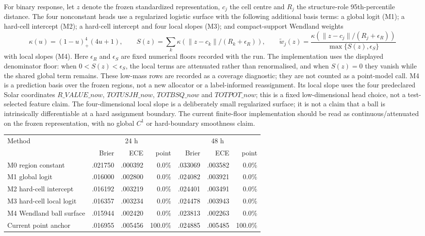 \documentclass[11pt,a4paper]{article}
\numberwithin{equation}{section}
\theoremstyle{definition}\newtheorem{definition}[theorem]{Definition}
\theoremstyle{remark}\newtheorem{remark}[theorem]{Remark}
\begin{document}
For binary response, let $z$ denote the frozen standardized representation, $c_j$ the cell centre and $R_j$ the structure-role 95th-percentile distance. The four nonconstant heads use a regularized logistic surface with the following additional basis terms: a global logit (M1); a hard-cell intercept (M2); a hard-cell intercept and four local slopes (M3); and compact-support Wendland weights
\[
\kappa(u)=(1-u)_+^4(4u+1),\qquad
S(z)=\sum_k\kappa(\|z-c_k\|/(R_k+\epsilon_R)),\qquad
\widetilde w_j(z)=\frac{\kappa(\|z-c_j\|/(R_j+\epsilon_R))}{\max\{S(z),\epsilon_S\}}
\]
with local slopes (M4). Here $\epsilon_R$ and $\epsilon_S$ are fixed numerical floors recorded with the run. The implementation uses the displayed denominator floor: when $0<S(z)<\epsilon_S$, the local terms are attenuated rather than renormalised, and when $S(z)=0$ they vanish while the shared global term remains. These low-mass rows are recorded as a coverage diagnostic; they are not counted as a point-model call. M4 is a prediction basis over the frozen regions, not a new allocator or a label-informed reassignment. Its local slope uses the four predeclared Solar coordinates $R\_VALUE\_now$, $TOTUSJH\_now$, $TOTBSQ\_now$ and $TOTPOT\_now$; this is a fixed low-dimensional head choice, not a test-selected feature claim. The four-dimensional local slope is a deliberately small regularized surface; it is not a claim that a ball is intrinsically differentiable at a hard assignment boundary. The current finite-floor implementation should be read as continuous/attenuated on the frozen representation, with no global $C^1$ or hard-boundary smoothness claim.

\begin{center}
\small
\begin{tabularx}{\linewidth}{lrrrrrr}
\toprule
Method & \multicolumn{3}{c}{24 h} & \multicolumn{3}{c}{48 h}\\
 & Brier & ECE & point & Brier & ECE & point\\
\midrule
M0 region constant & .021750 & .000392 & 0.0\% & .033069 & .003582 & 0.0\%\\
M1 global logit & .016000 & .002800 & 0.0\% & .024082 & .003921 & 0.0\%\\
M2 hard-cell intercept & .016192 & .003219 & 0.0\% & .024401 & .003491 & 0.0\%\\
M3 hard-cell local logit & .016357 & .003234 & 0.0\% & .024478 & .003943 & 0.0\%\\
M4 Wendland ball surface & .015944 & .002420 & 0.0\% & .023813 & .002263 & 0.0\%\\
Current point anchor & .016955 & .005456 & 100.0\% & .024885 & .005485 & 100.0\%\\
\bottomrule
\end{tabularx}
\end{center}
\end{document}
